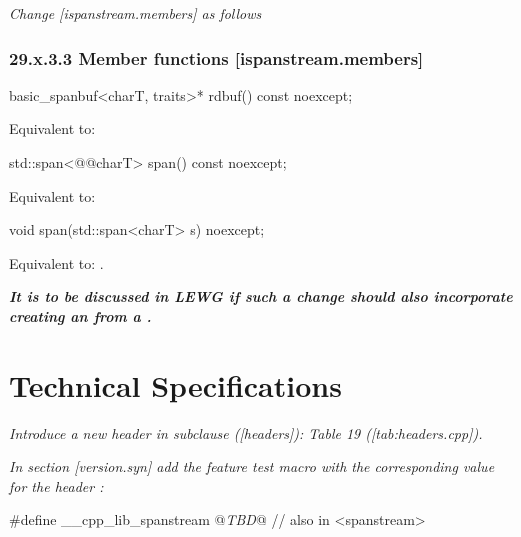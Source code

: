 \documentclass[ebook,11pt,article]{memoir}
\begin{document}
\emph{Change [ispanstream.members] as follows}
\subsection{29.x.3.3 Member functions [ispanstream.members]}
\label{ispanstream.members}

\begin{itemdecl}
basic_spanbuf<charT, traits>* rdbuf() const noexcept;
\end{itemdecl}

\begin{itemdescr}
\pnum
\effects Equivalent to:\\
\end{itemdescr}

\begin{itemdecl}
std::span<@@charT> span() const noexcept;
\end{itemdecl}

\begin{itemdescr}
\pnum
\effects Equivalent to:\\
\end{itemdescr}

\begin{itemdecl}
void span(std::span<charT> s) noexcept;
\end{itemdecl}

\begin{itemdescr}
\pnum
\effects
Equivalent to:
.
\end{itemdescr}


\textbf{\emph{It is to be discussed in LEWG if such a change should also incorporate creating an  from a .}
}
\chapter{Technical Specifications}

\emph{Introduce a new header  in subclause ([headers]): Table 19 ([tab:headers.cpp]).}

\emph{In section [version.syn] add the feature test macro  
with the corresponding value for the header :}
\begin{codeblock}
#define __cpp_lib_spanstream  @\emph{TBD}@ // also in <spanstream>
\end{codeblock}
\end{document}
